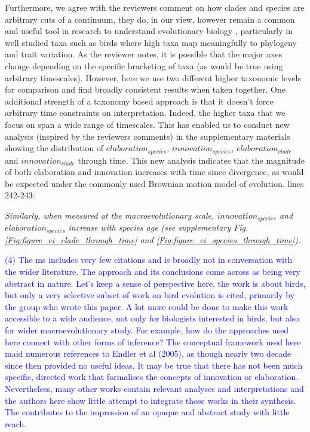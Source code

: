 \documentclass[12pt,letterpaper]{article}
\begin{document}
{Furthermore, we agree with the reviewers comment on how clades and species are arbitrary cuts of a continuum, they do, in our view, however remain a common and useful tool in research to understand evolutionary biology \cite{baker2021nothing}, particularly in well studied taxa such as birds where high taxa map meaningfully to phylogeny and trait variation. As the reviewer notes, it is possible that the major axes change depending on the specific bracketing of taxa (as would be true using arbitrary timescales). However, here we use two different higher taxonomic levels for comparison and find broadly consistent results when taken together. One additional strength of a taxonomy based approach is that it doesn’t force arbitrary time constraints on interpretation. Indeed, the higher taxa that we focus on span a wide range of timescales. This has enabled us to conduct new analysis (inspired by the reviewers comments) in the supplementary materials showing the distribution of $elaboration_{species}$, $innovation_{species}$, $elaboration_{clade}$ and $innovation_{clade}$ through time. This new analysis indicates that the magnitude of both elaboration and innovation increases with time since divergence, as would be expected under the commonly used Brownian motion model of evolution. lines 242-243: %

\noindent\textit{Similarly, when measured at the macroevolutionary scale, $innovation_{species}$ and $elaboration_{species}$ increase with species age (see supplementary Fig. \ref{Fig:figure_ei_clade_through_time} and \ref{Fig:figure_ei_species_through_time}). }%

\textcolor{blue}{(4) The ms includes very few citations and is broadly not in conversation with the wider literature. The approach and its conclusions come across as being very abstract in nature. Let's keep a sense of perspective here, the work is about birds, but only a very selective subset of work on bird evolution is cited, primarily by the group who wrote this paper. A lot more could be done to make this work accessible to a wide audience, not only for biologists interested in birds, but also for wider macroevolutionary study. For example, how do the approaches used here connect with other forms of inference? The conceptual framework used here maid numerous references to Endler et al (2005), as though nearly two decade since then provided no useful ideas. It may be true that there has not been much specific, directed work that formalises the concepts of innovation or elaboration. Nevertheless, many other works contain relevant analyses and interpretations and the authors here show little attempt to integrate those works in their synthesis. The contributes to the impression of an opaque and abstract study with little reach.}

}
\end{document}
